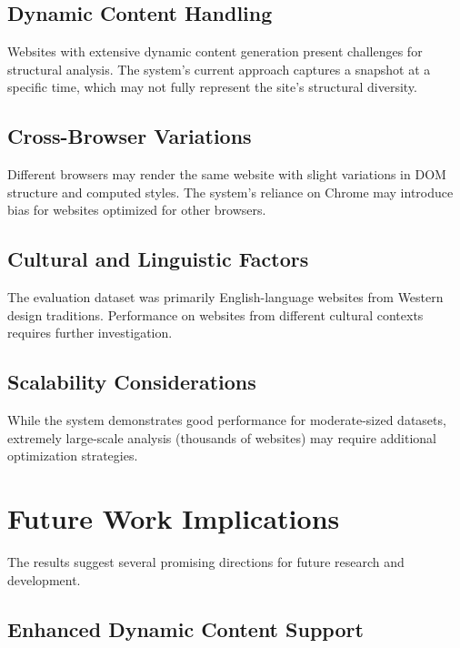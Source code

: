 \subsection{Dynamic Content Handling}
\label{subsec:dynamic-content}

Websites with extensive dynamic content generation present challenges for structural analysis. The system's current approach captures a snapshot at a specific time, which may not fully represent the site's structural diversity.

\subsection{Cross-Browser Variations}
\label{subsec:browser-variations}

Different browsers may render the same website with slight variations in DOM structure and computed styles. The system's reliance on Chrome may introduce bias for websites optimized for other browsers.

\subsection{Cultural and Linguistic Factors}
\label{subsec:cultural-factors}

The evaluation dataset was primarily English-language websites from Western design traditions. Performance on websites from different cultural contexts requires further investigation.

\subsection{Scalability Considerations}
\label{subsec:scalability-considerations}

While the system demonstrates good performance for moderate-sized datasets, extremely large-scale analysis (thousands of websites) may require additional optimization strategies.

\section{Future Work Implications}
\label{sec:future-work}

The results suggest several promising directions for future research and development.

\subsection{Enhanced Dynamic Content Support}
\label{subsec:enhanced-dynamic}

